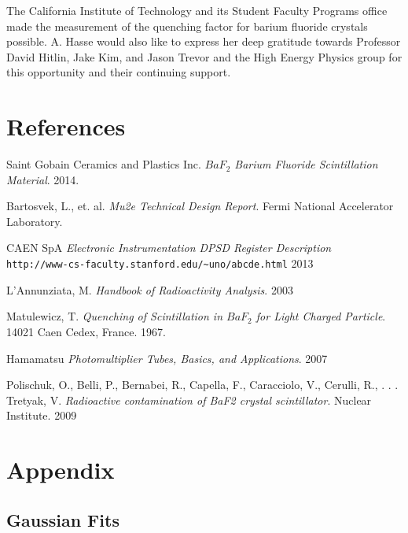 The California Institute of Technology and its Student Faculty Programs office made the measurement of the quenching factor for barium fluoride crystals possible. A. Hasse would also like to express her deep gratitude towards Professor David Hitlin, Jake Kim, and Jason Trevor and the High Energy Physics group for this opportunity and their continuing support. 
\squeezeup

\section{\label{sec:level1}References}
\squeezeup

\begin{thebibliography}{9}
Saint Gobain Ceramics and Plastics Inc. 
\textit{$BaF_2$ Barium Fluoride Scintillation Material}. 
2014.
 
Bartosvek, L., et. al.
\textit{Mu2e Technical Design Report}.
Fermi National Accelerator Laboratory. 
 
CAEN SpA
\textit{Electronic Instrumentation DPSD Register Description}
\\\texttt{http://www-cs-faculty.stanford.edu/\~{}uno/abcde.html}
2013

L'Annunziata, M.
\textit{Handbook of Radioactivity Analysis}.
2003

Matulewicz, T.
\textit{Quenching of Scintillation in $BaF_2$ for Light Charged Particle}.
14021 Caen Cedex, France. 1967.

Hamamatsu
\textit{Photomultiplier Tubes, Basics, and Applications}.
2007

Polischuk, O., Belli, P., Bernabei, R., Capella, F., Caracciolo, V., Cerulli, R., . . . Tretyak, V.
\textit{Radioactive contamination of BaF2 crystal scintillator}.
Nuclear Institute. 2009

\end{thebibliography}

\squeezeup

\section{\label{sec:level1}Appendix}

\subsection{\label{sec:level2}Gaussian Fits}
\squeezeup

